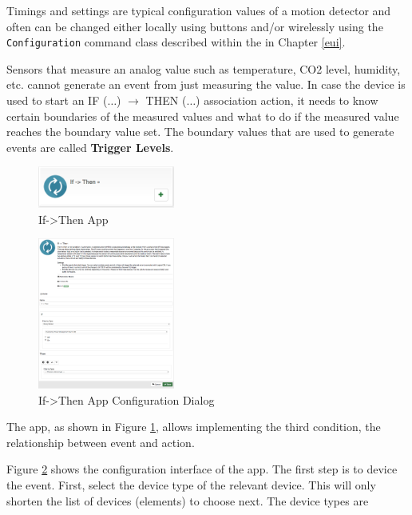 Timings and settings are typical configuration values of a motion detector and often can 
be changed either locally using buttons and/or wirelessly using the 
\texttt{Confi\-gura\-tion} command class described within the \zweui in Chapter \ref{eui}.

Sensors that measure an analog value such as temperature, CO2 level, humidity, etc. 
cannot generate an event from just measuring the value. In case the device is used to 
start an IF ($\ldots$) $\rightarrow$ THEN ($\ldots$) association action, it needs to know 
certain boundaries of the measured values and what to do if the measured value reaches 
the boundary value set. The boundary values that are used to generate events are 
called \textbf{Trigger Levels}.


\begin{figure}
\begin{center}
\includegraphics[width=0.4\textwidth]{pngs/cap6/app10.png}
\caption{If->Then App}
\label{app10}
\end{center}
\end{figure}

\begin{figure}
\begin{center}
\includegraphics[width=0.4\textwidth]{pngs/cap6/app11.png}
\caption{If->Then App Configuration Dialog}
\label{app11}
\end{center}
\end{figure}

The  app, as shown in Figure \ref{app10}, allows implementing the third condition, 
the relationship between event and action.

Figure \ref{app11} shows the configuration interface of the  app. The first step 
is to device the event. First, select the device type of the relevant device. This will 
only shorten the list of devices (elements) to choose next. The device types are

